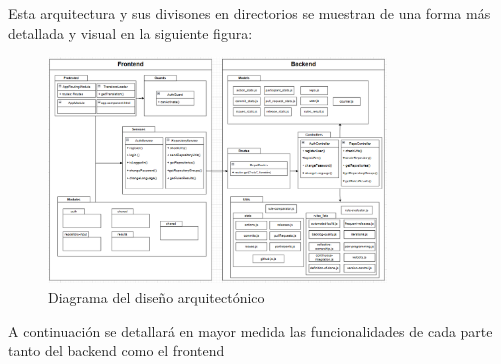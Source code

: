 Esta arquitectura y sus divisones en directorios se muestran de una forma más detallada y visual en la siguiente figura:

\begin{figure}[H]
\centering
\includegraphics[width=0.8\textwidth]{img/Diagrama-directorios.png}
\caption{Diagrama del diseño arquitectónico}
\label{fig:DiagramaDirectorios}
\end{figure}

A continuación se detallará en mayor medida las funcionalidades de cada parte tanto del backend como el frontend

